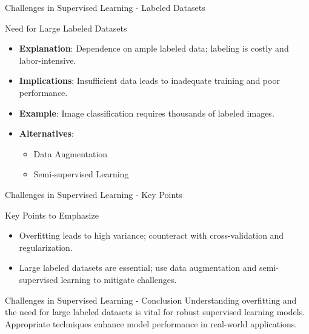 \documentclass[aspectratio=169]{beamer}
\begin{document}
\begin{frame}[fragile]{Challenges in Supervised Learning - Labeled Datasets}
    \begin{block}{Need for Large Labeled Datasets}
        \begin{itemize}
            \item \textbf{Explanation}: Dependence on ample labeled data; labeling is costly and labor-intensive.
            \item \textbf{Implications}: Insufficient data leads to inadequate training and poor performance.
            \item \textbf{Example}: Image classification requires thousands of labeled images.
            \item \textbf{Alternatives}:
            \begin{itemize}
                \item Data Augmentation
                \item Semi-supervised Learning
            \end{itemize}
        \end{itemize}
    \end{block}
\end{frame}

\begin{frame}[fragile]{Challenges in Supervised Learning - Key Points}
    \begin{block}{Key Points to Emphasize}
        \begin{itemize}
            \item Overfitting leads to high variance; counteract with cross-validation and regularization.
            \item Large labeled datasets are essential; use data augmentation and semi-supervised learning to mitigate challenges.
        \end{itemize}
    \end{block}
\end{frame}

\begin{frame}[fragile]{Challenges in Supervised Learning - Conclusion}
    Understanding overfitting and the need for large labeled datasets is vital for robust supervised learning models. Appropriate techniques enhance model performance in real-world applications.
\end{frame}
\end{document}
